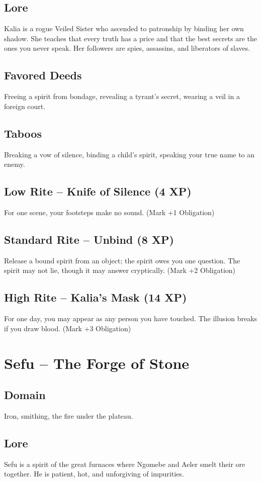\documentclass[11pt]{book}
\begin{document}
\subsection*{Lore}
Kalia is a rogue Veiled Sister who ascended to patronship by binding her own shadow. She teaches that every truth has a price and that the best secrets are the ones you never speak. Her followers are spies, assassins, and liberators of slaves.
\subsection*{Favored Deeds}
Freeing a spirit from bondage, revealing a tyrant's secret, wearing a veil in a foreign court.
\subsection*{Taboos}
Breaking a vow of silence, binding a child's spirit, speaking your true name to an enemy.
\subsection*{Low Rite -- Knife of Silence (4 XP)}
For one scene, your footsteps make no sound. (Mark +1 Obligation)
\subsection*{Standard Rite -- Unbind (8 XP)}
Release a bound spirit from an object; the spirit owes you one question. The spirit may not lie, though it may answer cryptically. (Mark +2 Obligation)
\subsection*{High Rite -- Kalia's Mask (14 XP)}
For one day, you may appear as any person you have touched. The illusion breaks if you draw blood. (Mark +3 Obligation)

\section{Sefu -- The Forge of Stone}
\subsection*{Domain}
Iron, smithing, the fire under the plateau.
\subsection*{Lore}
Sefu is a spirit of the great furnaces where Ngomebe and Aeler smelt their ore together. He is patient, hot, and unforgiving of impurities.
\end{document}
